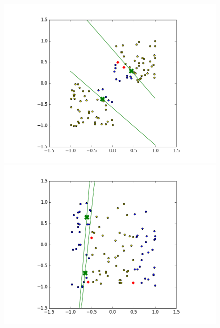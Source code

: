 \documentclass{article}
\theoremstyle{definition}
\begin{document}
\begin{figure}[H]
  \centering
  \begin{minipage}[b]{0.4\textwidth}
    \includegraphics[width=\textwidth]{RBFN-BH-01.png}
    \caption{}
  \end{minipage}
  \hfill
  \centering
  \begin{minipage}[b]{0.4\textwidth}
    \includegraphics[width=\textwidth]{RBFN-BH-02.png}
    \caption{}
  \end{minipage}
  \hfill
  \centering
  \begin{minipage}[b]{0.4\textwidth}

\end{minipage}
\end{figure}
\end{document}
